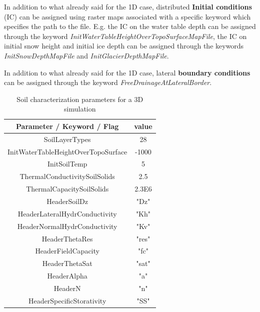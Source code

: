 In addition to what already said for the 1D case, distributed {\bf Initial conditions} (IC) can be assigned using raster maps associated with a specific keyword which specifies the path to the file. E.g. the IC on the water table depth can be assigned through the keyword {\it InitWaterTableHeightOverTopoSurfaceMapFile}, the IC on initial snow height and initial ice depth  can be assigned through the keywords {\it InitSnowDepthMapFile} and {\it
InitGlacierDepthMapFile}. 

In addition to what already said for the 1D case, lateral {\bf boundary conditions} can be assigned through the keyword { \it FreeDrainageAtLateralBorder}.
\begin{table}[h!]
\begin{center}
\begin{tabular}[c]{|c|c|}
\hline
Parameter / Keyword / Flag & value\\
\hline
SoilLayerTypes & 28 \\
InitWaterTableHeightOverTopoSurface & -1000 \\
InitSoilTemp & 5 \\
ThermalConductivitySoilSolids & 2.5 \\
ThermalCapacitySoilSolids & 2.3E6 \\
\hline
HeaderSoilDz & "Dz" \\
HeaderLateralHydrConductivity & "Kh" \\
HeaderNormalHydrConductivity & "Kv" \\
HeaderThetaRes & "res" \\
HeaderFieldCapacity & "fc" \\
HeaderThetaSat & "sat" \\
HeaderAlpha & "a" \\
HeaderN & "n" \\
HeaderSpecificStorativity & "SS" \\
\hline
\end{tabular}
\caption{Soil characterization parameters for a 3D simulation}
\label{tab:soilPar3D}
\end{center}
\end{table}

\vspace{-1.5cm}

